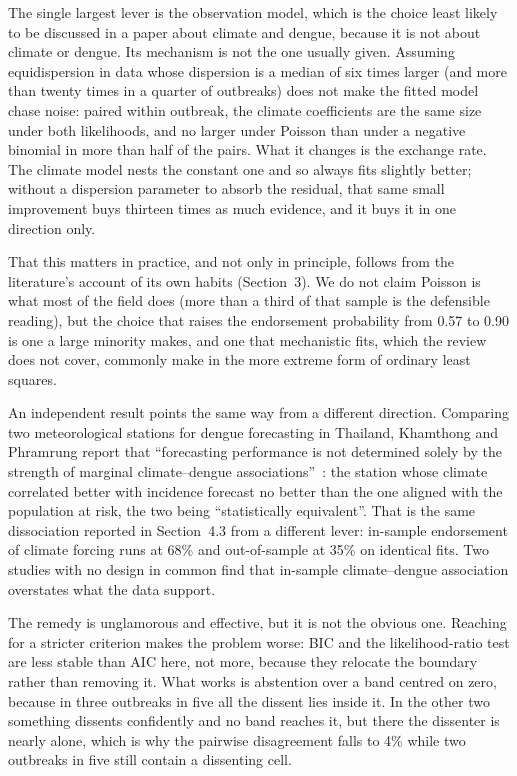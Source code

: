 \documentclass[11pt,a4paper]{article}
\begin{document}
The single largest lever is the observation model, which is the choice least
likely to be discussed in a paper about climate and dengue, because it is not
about climate or dengue. Its mechanism is not the one usually given. Assuming
equidispersion in data whose dispersion is a median of six times larger (and
more than twenty times in a quarter of outbreaks) does not make the fitted
model chase noise: paired within outbreak, the climate coefficients are the same
size under both likelihoods, and no larger under Poisson than under a negative
binomial in more than half of the pairs. What it changes is the exchange rate.
The climate model nests the constant one and so always fits slightly better;
without a dispersion parameter to absorb the residual, that same small
improvement buys thirteen times as much evidence, and it buys it in one direction
only.

That this matters in practice, and not only in principle, follows from the
literature's account of its own habits (Section~3). We do not claim Poisson is
what most of the field does (more than a third of that sample is the
defensible reading), but the choice that raises the endorsement probability
from 0.57 to 0.90 is one a large minority makes, and one that mechanistic fits,
which the review does not cover, commonly make in the more extreme form of
ordinary least squares.

An independent result points the same way from a different direction. Comparing
two meteorological stations for dengue forecasting in Thailand, Khamthong and
Phramrung report that ``forecasting performance is not determined solely by the
strength of marginal climate--dengue associations''~\cite{spatial2026}: the
station whose climate correlated better with incidence forecast no better than the
one aligned with the population at risk, the two being ``statistically
equivalent''.
That is the same dissociation reported in Section~4.3 from a different lever: in-sample endorsement of climate forcing runs at 68\% and out-of-sample at 35\%
on identical fits. Two studies with no design in common find that in-sample
climate--dengue association overstates what the data support.

The remedy is unglamorous and effective, but it is not the obvious one. Reaching
for a stricter criterion makes the problem worse: BIC and the likelihood-ratio
test are less stable than AIC here, not more, because they relocate the boundary
rather than removing it. What works is abstention over a band centred on zero,
because in three outbreaks in five all the dissent lies inside it. In the other
two something dissents confidently and no band reaches it, but there the
dissenter is nearly alone, which is why the pairwise disagreement falls to 4\%
while two outbreaks in five still contain a dissenting cell.
\end{document}
